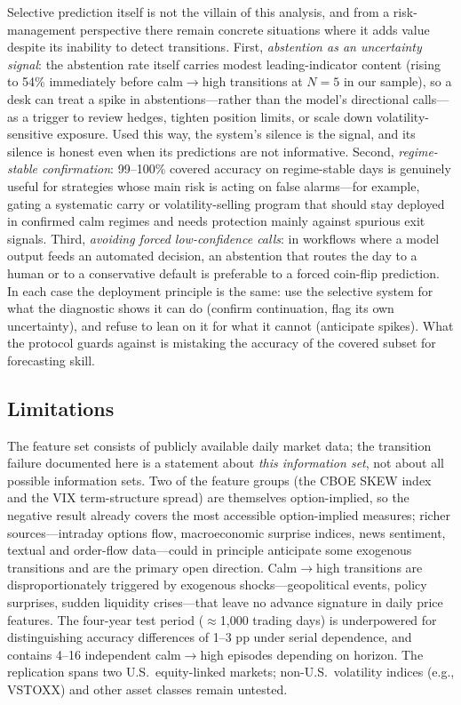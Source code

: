 \documentclass[12pt]{article}
\begin{document}
Selective prediction itself is not the villain of this analysis, and from a risk-management
perspective there remain concrete situations where it adds value despite its inability to
detect transitions. First, \emph{abstention as an uncertainty signal}: the abstention rate
itself carries modest leading-indicator content (rising to 54\% immediately before
calm$\to$high transitions at $N = 5$ in our sample), so a desk can treat a spike in
abstentions---rather than the model's directional calls---as a trigger to review hedges,
tighten position limits, or scale down volatility-sensitive exposure. Used this way, the
system's silence is the signal, and its silence is honest even when its predictions are not
informative. Second, \emph{regime-stable confirmation}: 99--100\% covered accuracy on
regime-stable days is genuinely useful for strategies whose main risk is acting on false
alarms---for example, gating a systematic carry or volatility-selling program that should
stay deployed in confirmed calm regimes and needs protection mainly against spurious exit
signals. Third, \emph{avoiding forced low-confidence calls}: in workflows where a model
output feeds an automated decision, an abstention that routes the day to a human or to a
conservative default is preferable to a forced coin-flip prediction. In each case the
deployment principle is the same: use the selective system for what the diagnostic shows it
can do (confirm continuation, flag its own uncertainty), and refuse to lean on it for what
it cannot (anticipate spikes). What the protocol guards against is mistaking the accuracy of
the covered subset for forecasting skill.

\subsection*{Limitations}

The feature set consists of publicly available daily market data; the transition failure
documented here is a statement about \emph{this information set}, not about all possible
information sets. Two of the feature groups (the CBOE SKEW index and the VIX term-structure
spread) are themselves option-implied, so the negative result already covers the most
accessible option-implied measures; richer sources---intraday options flow, macroeconomic
surprise indices, news sentiment, textual and order-flow data---could in principle anticipate
some exogenous transitions and are the primary open direction. Calm$\to$high transitions are
disproportionately triggered by exogenous shocks---geopolitical events, policy surprises,
sudden liquidity crises---that leave no advance signature in daily price features. The
four-year test period ($\approx$1,000 trading days) is underpowered for distinguishing
accuracy differences of 1--3 pp under serial dependence, and contains 4--16 independent
calm$\to$high episodes depending on horizon. The replication spans two U.S.\ equity-linked
markets; non-U.S.\ volatility indices (e.g., VSTOXX) and other asset classes remain untested.
\end{document}
